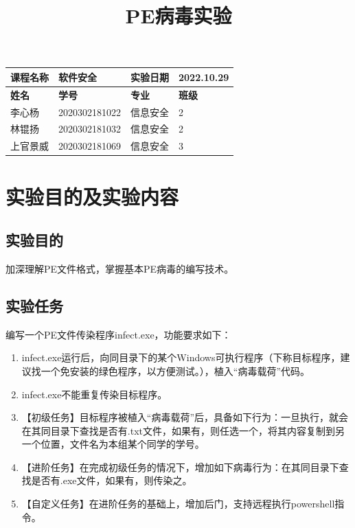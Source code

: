 \documentclass[UTF8]{ctexart}
\begin{document}
	\title{PE病毒实验}
	\author{}
	\date{\vspace{-8ex}}
	\maketitle
	\begin{table}[h]
		\centering
		
		\begin{tabular}{|p{2.5cm}<{\centering}|p{4.5cm}<{\centering}|p{3cm}<{\centering}|p{2.5cm}<{\centering}|}
			\hline
			\textbf{课程名称} & 软件安全         & \textbf{实验日期} & 2022.10.29   \\ \hline
			\textbf{姓名}   & \textbf{学号}   & \textbf{专业}   & \textbf{班级} \\ \hline
			李心杨           & 2020302181022 & 信息安全          & 2           \\
			林锟扬           & 2020302181032 & 信息安全          & 2           \\
			上官景威      &  2020302181069 & 信息安全          & 3           \\ \hline
		\end{tabular}
	\end{table}
	\tableofcontents
	\pagebreak
	
	\section{实验目的及实验内容}
	\subsection{实验目的}
	加深理解PE文件格式，掌握基本PE病毒的编写技术。
	\subsection{实验任务}
	编写一个PE文件传染程序infect.exe，功能要求如下：
	\begin{enumerate}
		\item infect.exe运行后，向同目录下的某个Windows可执行程序（下称目标程序，建议找一个免安装的绿色程序，以方便测试。），植入“病毒载荷”代码。
		\item infect.exe不能重复传染目标程序。
		\item【初级任务】目标程序被植入“病毒载荷”后，具备如下行为：一旦执行，就会在其同目录下查找是否有.txt文件，如果有，则任选一个，将其内容复制到另一个位置，文件名为本组某个同学的学号。
		\item【进阶任务】在完成初级任务的情况下，增加如下病毒行为：在其同目录下查找是否有.exe文件，如果有，则传染之。
		\item【自定义任务】在进阶任务的基础上，增加后门，支持远程执行powershell指令。
	\end{enumerate}
\end{document}
